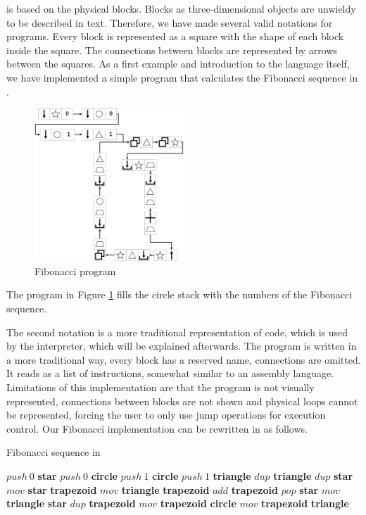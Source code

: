 \sculpt is based on the physical blocks. Blocks as three-dimensional objects are unwieldy to be described in text.
Therefore, we have made several valid notations for \sculpt programs.
Every block is represented as a square with the shape of each block inside the square.
The connections between blocks are represented by arrows between the squares.
As a first example and introduction to the language itself, we have implemented a simple program that calculates the Fibonacci sequence in \sculpt.

\begin{figure}
    \centering
    \includegraphics[width=0.5\textwidth]{figures/ArtlangFibpng}
    \caption{\sculpt Fibonacci program}
    \label{fig:artlangfib}
    \vspace{5pt}
\end{figure}

The program in Figure \ref{fig:artlangfib} fills the circle stack with the numbers of the Fibonacci sequence.

The second notation is a more traditional representation of code, which is used by the \sculpter interpreter, which will be explained afterwards.
The program is written in a more traditional way, every block has a reserved name, connections are omitted. It reads as a list of instructions, somewhat similar to an assembly language.
Limitations of this implementation are that the program is not visually represented, connections between blocks are not shown and physical loops cannot be represented, forcing the user to only use jump operations for execution control.
Our Fibonacci implementation can be rewritten in \sculpter as follows.

\begin{algorithm}
    \caption{Fibonacci sequence in \sculpt}
    \label{alg:fib}
    \begin{algorithmic}
    \State $push~0$ \textbf{star}
    \State $push~0$ \textbf{circle}
    \State $push~1$ \textbf{circle}
    \State $push~1$ \textbf{triangle}
        \State $dup$ \textbf{triangle}
        \State $dup$ \textbf{star}
        \State $mov$ \textbf{star} \textbf{trapezoid}
        \State $mov$ \textbf{triangle} \textbf{trapezoid}
        \State $add$ \textbf{trapezoid}
        \State $pop$ \textbf{star}
        \State $mov$ \textbf{triangle} \textbf{star}
        \State $dup$ \textbf{trapezoid}
        \State $mov$ \textbf{trapezoid} \textbf{circle}
        \State $mov$ \textbf{trapezoid} \textbf{triangle}
    \EndWhile
    \end{algorithmic}
    \end{algorithm}
\endinput

